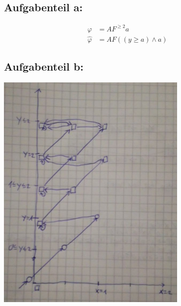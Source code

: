 
\subsection*{Aufgabenteil a:}

\begin{align*}
\varphi &= AF^{\geq 2}a\\
\hat{\varphi} &= AF((y\geq a)\wedge a)
\end{align*}

\subsection*{Aufgabenteil b:}

\includegraphics[width=0.7\textwidth]{3.jpeg}